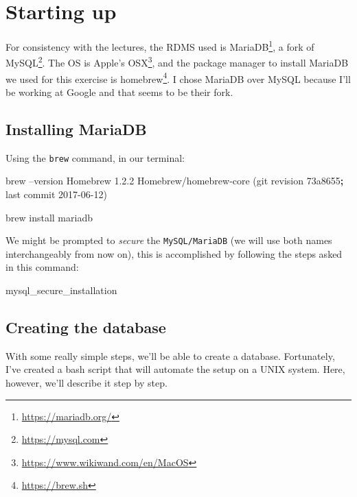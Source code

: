 \documentclass[english,a4paper,]{report}
\newenvironment{Shaded}{}{}
\newcommand{\KeywordTok}[1]{\textcolor[rgb]{0.00,0.44,0.13}{\textbf{#1}}}
\newcommand{\FunctionTok}[1]{\textcolor[rgb]{0.02,0.16,0.49}{#1}}
\newcommand{\ExtensionTok}[1]{#1}
\newcommand{\NormalTok}[1]{#1}
\renewcommand{\href}[2]{#2\footnote{\url{#1}}}
\begin{document}
\chapter{Starting up}\label{starting-up}

For consistency with the lectures, the RDMS used is
\href{https://mariadb.org/}{MariaDB}, a fork of
\href{https://mysql.com}{MySQL}. The OS is Apple's
\href{https://www.wikiwand.com/en/MacOS}{OSX}, and the package manager
to install MariaDB we used for this exercise is
\href{https://brew.sh}{homebrew}. I chose MariaDB over MySQL because
I'll be working at Google and that seems to be their fork.

\section{Installing MariaDB}\label{installing-mariadb}

Using the \texttt{brew} command, in our terminal:

\begin{Shaded}
\begin{Highlighting}[]
\ExtensionTok{brew}\NormalTok{ --version}
\ExtensionTok{Homebrew}\NormalTok{ 1.2.2}
\ExtensionTok{Homebrew/homebrew-core}\NormalTok{ (git revision 73a8655}\KeywordTok{;} \FunctionTok{last}\NormalTok{ commit 2017-06-12)}

\ExtensionTok{brew}\NormalTok{ install mariadb}
\end{Highlighting}
\end{Shaded}

We might be prompted to \emph{secure} the \texttt{MySQL/MariaDB} (we
will use both names interchangeably from now on), this is accomplished
by following the steps asked in this command:

\begin{Shaded}
\begin{Highlighting}[]
\ExtensionTok{mysql_secure_installation}
\end{Highlighting}
\end{Shaded}

\section{Creating the database}\label{creating-the-database}

With some really simple steps, we'll be able to create a database.
Fortunately, I've created a bash script that will automate the setup on
a UNIX system. Here, however, we'll describe it step by step.
\end{document}
